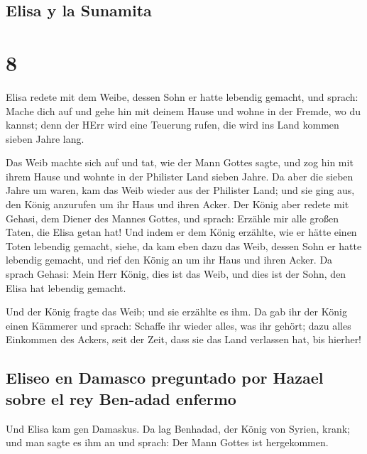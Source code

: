 \hypertarget{elisa-y-la-sunamita}{%
\subsection{Elisa y la Sunamita}\label{elisa-y-la-sunamita}}

\hypertarget{section-7}{%
\section{8}\label{section-7}}

 Elisa redete mit dem Weibe, dessen Sohn er hatte lebendig
gemacht, und sprach: Mache dich auf und gehe hin mit deinem Hause und
wohne in der Fremde, wo du kannst; denn der HErr wird eine Teuerung
rufen, die wird ins Land kommen sieben Jahre lang.

 Das Weib machte sich auf und tat, wie der Mann Gottes
sagte, und zog hin mit ihrem Hause und wohnte in der Philister Land
sieben Jahre.  Da aber die sieben Jahre um waren, kam das
Weib wieder aus der Philister Land; und sie ging aus, den König
anzurufen um ihr Haus und ihren Acker.  Der König aber
redete mit Gehasi, dem Diener des Mannes Gottes, und sprach: Erzähle mir
alle großen Taten, die Elisa getan hat!  Und indem er dem
König erzählte, wie er hätte einen Toten lebendig gemacht, siehe, da kam
eben dazu das Weib, dessen Sohn er hatte lebendig gemacht, und rief den
König an um ihr Haus und ihren Acker. Da sprach Gehasi: Mein Herr König,
dies ist das Weib, und dies ist der Sohn, den Elisa hat lebendig
gemacht.

 Und der König fragte das Weib; und sie erzählte es ihm.
Da gab ihr der König einen Kämmerer und sprach: Schaffe ihr wieder
alles, was ihr gehört; dazu alles Einkommen des Ackers, seit der Zeit,
dass sie das Land verlassen hat, bis hierher!

\hypertarget{eliseo-en-damasco-preguntado-por-hazael-sobre-el-rey-ben-adad-enfermo}{%
\subsection{Eliseo en Damasco preguntado por Hazael sobre el rey
Ben-adad
enfermo}\label{eliseo-en-damasco-preguntado-por-hazael-sobre-el-rey-ben-adad-enfermo}}

 Und Elisa kam gen Damaskus. Da lag Benhadad, der König
von Syrien, krank; und man sagte es ihm an und sprach: Der Mann Gottes
ist hergekommen.

